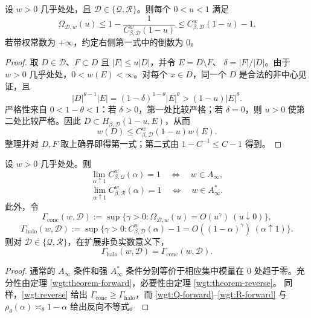 \begin{theorem}[反向集中估计]\label{wgt:theorem-reverse}
设 \(w>0\) 几乎处处，且 \(\mathcal D\in\{\mathcal Q,\mathcal R\}\)。则每个 \(0<u<1\) 满足
\begin{equation}
 \Omega_{\mathcal D,w}(u)
 \leq1-\frac1{C^w_{\beta,\mathcal D}(1-u)}
 \leq C^w_{\beta,\mathcal D}(1-u)-1.
\label{wgt:reverse}
\end{equation}
若带权常数为 \(+\infty\)，约定右侧第一式中的倒数为 \(0\)。
\end{theorem}

\begin{proof}
取 \(D\in\mathcal D\)、\(F\subset D\) 且 \(|F|\leq u|D|\)，并令 \(E=D\setminus F\)、
\(\delta=|F|/|D|\)。由于 \(w>0\) 几乎处处，\(0<w(E)<\infty\)。对每个 \(x\in D\)，同一个
\(D\) 是合法的非中心见证，且
\[
 |D|^{\theta-1}|E|
 =(1-\delta)^{1-\theta}|E|^\theta>(1-u)|E|^\theta.
\]
严格性来自 \(0<1-\theta<1\)：若 \(\delta>0\)，第一处比较严格；若 \(\delta=0\)，则
\(u>0\) 使第二处比较严格。因此 \(D\subset H_{\beta,\mathcal D}(1-u,E)\)，从而
\[
 w(D)\leq C^w_{\beta,\mathcal D}(1-u)w(E).
\]
整理并对 \(D,F\) 取上确界即得第一式；第二式由 \(1-C^{-1}\leq C-1\) 得到。
\end{proof}

\begin{corollary}[权类刻画与指数保持]\label{wgt:corollary-Ainfty}
设 \(w>0\) 几乎处处。则
\[
 \lim_{\alpha\uparrow1}C^w_{\beta,\mathcal Q}(\alpha)=1
 \quad\Longleftrightarrow\quad w\in A_\infty,
\]
\[
 \lim_{\alpha\uparrow1}C^w_{\beta,\mathcal R}(\alpha)=1
 \quad\Longleftrightarrow\quad w\in A_\infty^\ast.
\]
此外，令
\[
 \Gamma_{\mathrm{conc}}(w,\mathcal D)
 :=\sup\{\gamma>0:\Omega_{\mathcal D,w}(u)=O(u^\gamma)\ (u\downarrow0)\},
\]
\[
 \Gamma_{\mathrm{halo}}(w,\mathcal D)
 :=\sup\{\gamma>0:C^w_{\beta,\mathcal D}(\alpha)-1
 =O((1-\alpha)^\gamma)\ (\alpha\uparrow1)\}.
\]
则对 \(\mathcal D\in\{\mathcal Q,\mathcal R\}\)，在扩展非负实数意义下，
\begin{equation}
 \Gamma_{\mathrm{halo}}(w,\mathcal D)=\Gamma_{\mathrm{conc}}(w,\mathcal D).
\label{wgt:exponent-preservation}
\end{equation}
\end{corollary}

\begin{proof}
通常的 \(A_\infty\) 条件和强 \(A_\infty^\ast\) 条件分别等价于相应集中模量在 \(0\) 处趋于零。充分性由定理 \ref{wgt:theorem-forward}，必要性由定理 \ref{wgt:theorem-reverse}。
同样，\eqref{wgt:reverse} 给出 \(\Gamma_{\mathrm{conc}}\geq\Gamma_{\mathrm{halo}}\)，而
\eqref{wgt:Q-forward}--\eqref{wgt:R-forward} 与 \(\rho_\theta(\alpha)\asymp_\theta1-\alpha\)
给出反向不等式。
\end{proof}

